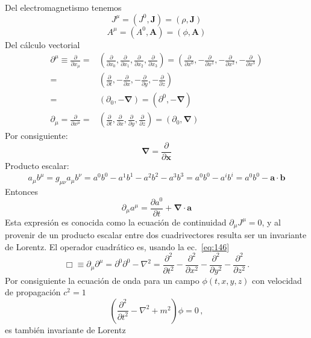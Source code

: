 Del electromagnetismo tenemos
\begin{equation}
  \label{eq:cv_jmu}
  J^\mu=(J^0,\mathbf{J})=(\rho,\mathbf{J})
\end{equation}
\begin{equation}
  \label{eq:cv_phia}
  A^\mu=(A^0,\mathbf{A})=(\phi,\mathbf{A})
\end{equation}
Del c\'alculo vectorial
\begin{align}
  \partial^\mu\equiv\frac{\partial}{\partial x_\mu}=&
  \left(
    \frac{\partial}{\partial x_0},\frac{\partial}{\partial x_1},\frac{\partial}{\partial x_2},\frac{\partial}{\partial x_3}
  \right)=\left(
    \frac{\partial}{\partial x^0},-\frac{\partial}{\partial x^1},-\frac{\partial}{\partial x^2},-\frac{\partial}{\partial x^3}
  \right)\nonumber\\
  =&\left(
    \frac{\partial}{\partial t},-\frac{\partial}{\partial x},-\frac{\partial}{\partial y},-\frac{\partial}{\partial z}
  \right)\nonumber\\
  =&(\partial_0,-\boldsymbol{\nabla})=(\partial^0,-\boldsymbol{\nabla})\\
  \partial_\mu=\frac{\partial}{\partial x^\mu}=&\left(
    \frac{\partial}{\partial t},\frac{\partial}{\partial x},\frac{\partial}{\partial y},\frac{\partial}{\partial z}
  \right)
  =(\partial_0,\boldsymbol{\nabla})
\end{align}
Por consiguiente:
\begin{equation}
  \label{eq:nabla}
  \boldsymbol{\nabla}=\frac{\partial}{\partial\mathbf{x}}
\end{equation}
Producto escalar:
\begin{equation}
  a_\mu b^\mu=g_{\mu\nu}a_\mu b^\nu=a^0b^0-a^1b^1-a^2b^2-a^3b^3=a^0b^0-a^i b^i=a^0b^0-\mathbf{a}\cdot \mathbf{b}
\end{equation}
Entonces
\begin{equation}
  \partial_\mu a^\mu=\frac{\partial a^0}{\partial t}+\boldsymbol{\nabla}\cdot\mathbf{a}
\end{equation}
Esta expresión es conocida como la ecuaci\'on de continuidad $\partial_\mu J^\mu=0$, y al provenir de un producto escalar entre dos cuadrivectores resulta ser un invariante de Lorentz.
El operador cuadrático es, usando la ec.~\eqref{eq:146}
\begin{equation}
  \label{eq:dalambertian}
  \Box\equiv \partial_\mu\partial^\mu=\partial^0\partial^0-\nabla^2 =\frac{\partial^2}{\partial t^2}-\frac{\partial^2}{\partial x^2}-\frac{\partial^2}{\partial y^2}-\frac{\partial^2}{\partial z^2}\,.
\end{equation}
Por consiguiente la ecuaci\'on de onda para un campo $\phi(t,x,y,z)$  con velocidad de propagación $c^2=1$
\begin{equation}
  \left(
\frac{\partial^2}{\partial t^2}-\nabla^2+m^2
  \right)\phi=0\,,
\end{equation}
es también invariante de Lorentz

